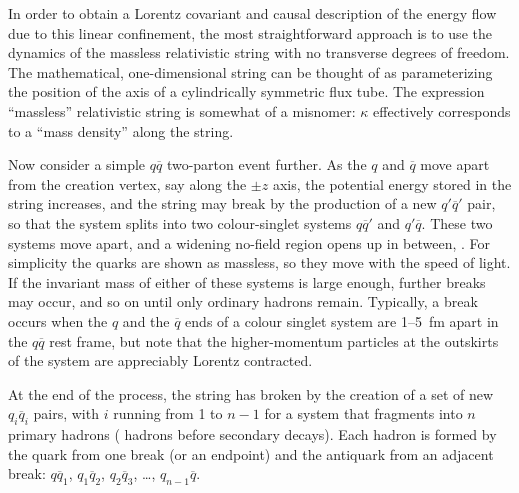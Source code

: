 In order to obtain a Lorentz covariant and causal description of the 
energy flow due to this linear confinement, the most straightforward 
approach is to use the dynamics of the massless relativistic string with 
no transverse degrees of freedom. The mathematical, one-dimensional 
string can be thought of as parameterizing the position of the axis 
of a cylindrically symmetric flux tube.  The expression ``massless'' 
relativistic string is somewhat of a misnomer: $\kappa$ effectively 
corresponds to a ``mass density'' along the string.

Now consider a simple $q\overline{q}$ two-parton event further.
As the $q$ and $\overline{q}$ move apart from the creation vertex, 
say along the $\pm z$ axis, the potential energy stored in the string 
increases, and the string may break by the production of a new 
$q'\overline{q}'$ pair, so that the system splits into two 
colour-singlet systems $q\overline{q}'$ and $q'\overline{q}$. 
These two systems move apart, and a widening no-field region opens up
in between, . For simplicity the quarks are 
shown as massless, so they move with the speed of light. If the 
invariant mass of either of these systems is large enough, further 
breaks may occur, and so on until only ordinary hadrons remain. 
Typically, a break occurs when the $q$ and the $\overline{q}$ ends 
of a colour singlet system are 1--5~fm apart in the $q\overline{q}$ 
rest frame, but note that the higher-momentum particles at the 
outskirts of the system are appreciably Lorentz contracted.

At the end of the process, the string has broken by the creation of a 
set of new $q_i\overline{q}_i$ pairs, with $i$ running from 1 to
$n-1$ for a system that fragments into $n$ primary hadrons (\ie
hadrons before secondary decays). Each hadron is formed by the quark 
from one break (or an endpoint) and the antiquark from an adjacent break:
$q\overline{q}_1$, $q_1\overline{q}_2$, $q_2\overline{q}_3$, \ldots, 
$q_{n-1}\overline{q}$.

